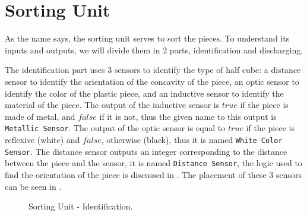 \section{Sorting Unit}
\label{sec:sortingUnit}
As the name says, the sorting unit serves to sort the pieces.
To understand its inputs and outputs, we will divide them in 2 parts,
identification and discharging.

The identification part uses 3 sensors to identify the type of half cube: a
distance sensor to identify the orientation of the concavity of the piece, an
optic sensor to identify the color of the plastic piece, and an inductive sensor
to identify the material of the piece. The output of the inductive sensor is
$true$ if the piece is made of metal, and $false$ if it is not, thus the given
name to this output is \verb|Metallic Sensor|. The output of the optic sensor is
equal to $true$ if the piece is reflexive (white) and $false$, otherwise
(black), thus it is named \verb|White Color Sensor|. The distance sensor outputs
an integer corresponding to the distance between the piece and the sensor, it is
named \verb|Distance Sensor|, the logic used to find the orientation of the
piece is discussed in .
The placement of these 3 sensors can be seen in . 
\begin{figure}[H]
  \centering
  \caption{Sorting Unit - Identification.}
  \label{fig:sortIden}
\end{figure}

